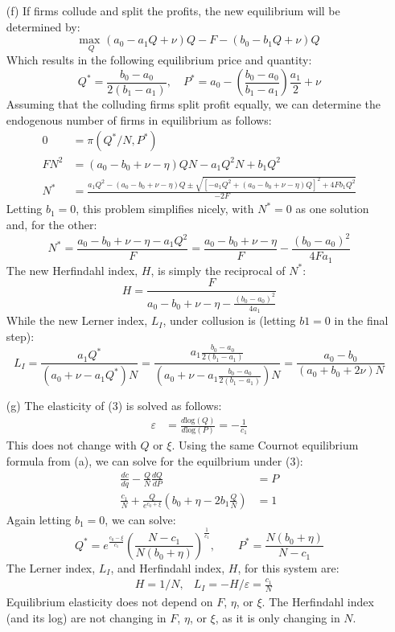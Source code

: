 \documentclass{article}
\newcommand{\loge}[1]{\text{log}\left(#1\right)}
\newcommand{\usmax}[1]{\underset{#1}{\text{max }}}
\begin{document}
\begin{itemize}
    \item[(f)] If firms collude and split the profits, the new equilibrium will be determined by: \[
      \usmax{Q}(a_0-a_1Q+\nu)Q - F - (b_0-b_1Q + \nu)Q
    \]
    Which results in the following equilibrium price and quantity:\[
      Q^* = \frac{b_0-a_0}{2(b_1-a_1)},\quad P^* = a_0 - \left(\frac{b_0-a_0}{b_1-a_1}\right)\frac{a_1}{2} + \nu
    \]
    Assuming that the colluding firms split profit equally, we can determine the endogenous number of firms in equilibrium as follows:\begin{align*}
      0 &= \pi(Q^*/N,P^*)                                    \\
      FN^2 &= (a_0 - b_0 + \nu - \eta)QN - a_1Q^2N + b_1Q^2 \\
      N^* &= \frac{a_1Q^2-(a_0-b_0+\nu-\eta)Q\pm\sqrt{[-a_1Q^2+(a_0-b_0+\nu-\eta)Q]^2+4Fb_1Q^2}}{-2F}
    \end{align*}
    Letting ${b_1=0}$, this problem simplifies nicely, with $N^*=0$ as one solution and, for the other:\[
      N^* = \frac{a_0 - b_0 + \nu - \eta - a_1Q^2}{F} 
          = \frac{a_0 - b_0 + \nu - \eta}{F} - \frac{(b_0-a_0)^2}{4Fa_1}
    \]
    The new Herfindahl index, $H$, is simply the reciprocal of $N^*$:\[
      H = \frac{F}{a_0-b_0+\nu-\eta - \frac{(b_0-a_0)^2}{4a_1}}
    \]
    While the new Lerner index, $L_I$, under collusion is (letting ${b1=0}$ in the final step):\[
      L_I = \frac{a_1Q^*}{(a_0 + \nu - a_1Q^*)N} = \frac{a_1\frac{b_0-a_0}{2(b_1-a_1)}}{\left(a_0 + \nu - a_1\frac{b_0-a_0}{2(b_1-a_1)}\right)N} = \frac{a_0- b_0}{(a_0 + b_0 + 2\nu)N}
    \]

    \item[(g)] The elasticity of (3) is solved as follows: \begin{align*}
      \varepsilon &= \frac{d\loge{Q}}{d\loge{P}}= -\frac{1}{c_1}
    \end{align*}
    This does not change with $Q$ or $\xi$. Using the same Cournot equilibrium formula from (a), we can solve for the equilbrium under (3):\begin{align*}
      \frac{dc}{dq} - \frac{Q}{N}\frac{dQ}{dP} &= P \\
      \frac{c_1}{N} + \frac{Q}{e^{c_0 + \xi}}\left(b_0+\eta-2b_1\frac{Q}{N}\right) &= 1
    \end{align*}
    Again letting ${b_1=0}$, we can solve:\[
      Q^* = e^{\frac{c_0-\xi}{c_1}}\left(\frac{N-c_1}{N(b_0+\eta)}\right)^\frac{1}{c_1}, \quad\quad 
      P^* = \frac{N(b_0+\eta)}{N-c_1}
    \]
    The Lerner index, $L_I$, and Herfindahl index, $H$, for this system are:\begin{align*}
      &H = 1/N, &L_I = -H/\varepsilon = \frac{c_1}{N}
    \end{align*}
    Equilibrium elasticity does not depend on $F$, $\eta$, or $\xi$. The Herfindahl index (and its log) are not changing in $F$, $\eta$, or $\xi$, as it is only changing in $N$. 
\end{itemize}
\end{document}
